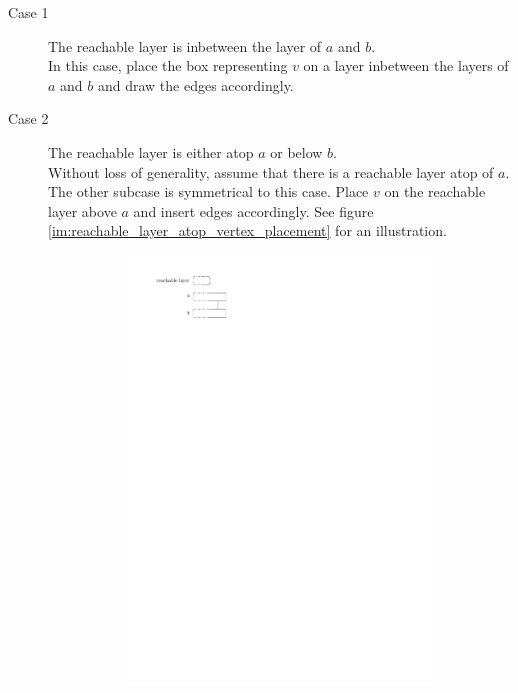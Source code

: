 \begin{description}
	\item[Case 1] The reachable layer is inbetween the layer of $a$ and $b$.\\
	In this case, place the box representing $v$ on a layer inbetween the layers of $a$ and $b$ and draw the edges accordingly.
	\item[Case 2] The reachable layer is either atop $a$ or below $b$.\\
	Without loss of generality, assume that there is a reachable layer atop of $a$. The other subcase is symmetrical to this case. Place $v$ on the reachable layer above $a$ and insert edges accordingly. See figure \ref{im:reachable_layer_atop_vertex_placement} for an illustration.
	\begin{figure}[H]
		\centering
	\begin{subfigure}{0.4\textwidth}
	\centering
	\includegraphics[page=2,width=\linewidth]{graphics/maximal_outerplanar_reachable_layers.pdf}

\end{subfigure}
\end{figure}
\end{description}
